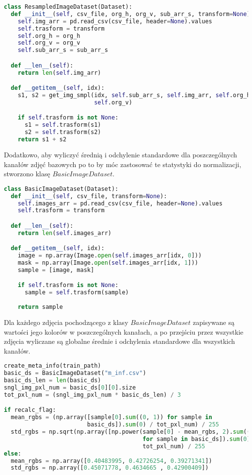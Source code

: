 \cell
\begin{lstlisting}[name=Rozdzial3.1, language=Python]
class ResampledImageDataset(Dataset):
  def __init__(self, csv_file, org_h, org_v, sub_arr_s, transform=None):
    self.img_arr = pd.read_csv(csv_file, header=None).values
    self.trasform = transform
    self.org_h = org_h
    self.org_v = org_v
    self.sub_arr_s = sub_arr_s

  def __len__(self):
    return len(self.img_arr)

  def __getitem__(self, idx):
    s1, s2 = get_img_smpl(idx, self.sub_arr_s, self.img_arr, self.org_h, 
                          self.org_v)   

    if self.trasform is not None:
      s1 = self.trasform(s1)
      s2 = self.trasform(s2)   
    return s1 + s2
\end{lstlisting}


\cell
Dodatkowo, aby wyliczyć średnią i odchylenie standardowe dla poszczególnych kanałów zdjęć bazowych po to by móc zastosować te statystyki do normalizacji, stworzono klasę $\textit{BasicImageDataset}$.

\cell
\begin{lstlisting}[name=Rozdzial3.1, language=Python]
class BasicImageDataset(Dataset):
  def __init__(self, csv_file, transform=None):
    self.images_arr = pd.read_csv(csv_file, header=None).values
    self.trasform = transform

  def __len__(self):
    return len(self.images_arr)

  def __getitem__(self, idx):
    image = np.array(Image.open(self.images_arr[idx, 0]))
    mask = np.array(Image.open(self.images_arr[idx, 1]))
    sample = [image, mask]

    if self.trasform is not None:
      sample = self.trasform(sample)
    
    return sample
\end{lstlisting}


\cell
Dla każdego zdjęcia pochodzącego z klasy $\textit{BasicImageDataset}$ zapisywane są wartości jego kolorów w poszczególnych kanałach, a po przejściu przez wszystkie zdjęcia wyliczane są globalne średnie i odchylenia standardowe dla wszystkich kanałów.

\cell
\begin{lstlisting}[name=Rozdzial3.1, language=Python]
create_meta_info(train_path)
basic_ds = BasicImageDataset("m_inf.csv")
basic_ds_len = len(basic_ds)
sngl_img_pxl_num = basic_ds[0][0].size
tot_pxl_num = (sngl_img_pxl_num * basic_ds_len) / 3

if recalc_flag:
  mean_rgbs = (np.array([sample[0].sum((0, 1)) for sample in 
                        basic_ds]).sum(0) / tot_pxl_num) / 255
  std_rgbs = np.sqrt(np.array([np.power(sample[0] - mean_rgbs, 2).sum((0, 1)) 
                                        for sample in basic_ds]).sum(0) / 
                                        tot_pxl_num) / 255
else:
  mean_rgbs = np.array([0.40483995, 0.42726254, 0.39271341])
  std_rgbs = np.array([0.45071778, 0.4634665 , 0.42900409])
\end{lstlisting}



